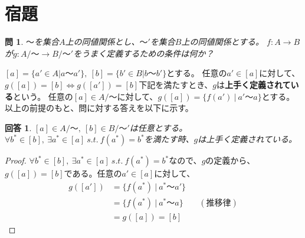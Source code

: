 \documentclass{jsarticle}
\newtheorem{Question}{問}
\newtheorem{Answer}{回答}
\newcommand{\2}{ {\bf 2} }
\begin{document}
    \section{宿題}
    \begin{Question}
        $〜$を集合$A$上の同値関係とし、$〜'$を集合$B$上の同値関係とする。
        $f:A \rightarrow B$が$g:A/〜 \rightarrow B/〜'$をうまく定義するための条件は何か？
    \end{Question}
    $[a]=\{a' \in A | a〜a'\},\ [b]=\{b' \in B | b〜b'\}$とする。
    任意の$a' \in [a]$に対して、$g([a])=[b] \Leftrightarrow g([a'])=[b]$下記を満たすとき、$g$は{\bf 上手く定義されている}という。
    任意の$[a] \in A/〜$に対して、$g([a])=\{f(a')\ |\ a' 〜 a \}$とする。
    以上の前提のもと、問に対する答えを以下に示す。
    \begin{Answer}
        $[a] \in A/ 〜,\ [b] \in B/〜'$は任意とする。\\
        $\forall b^* \in [b],\ \exists a^* \in [a]\ s.t.\ f(a^*)=b^*$を満たす時、$g$は上手く定義されている。
    \end{Answer}
    \begin{proof}
        $\forall b^* \in [b],\ \exists a^* \in [a]\ s.t.\ f(a^*)=b^*$なので、$g$の定義から、
        $g([a])=[b]$である。任意の$a'\in[a]$に対して、
        \begin{align*}
            g([a']) &= \{f(a^*)\ |\ a^* 〜 a'\} \\
            &=\{f(a^*)\ |\ a^*〜a\} &&(推移律)\\
            &=g([a])=[b]
        \end{align*}
    \end{proof}
\end{document}
